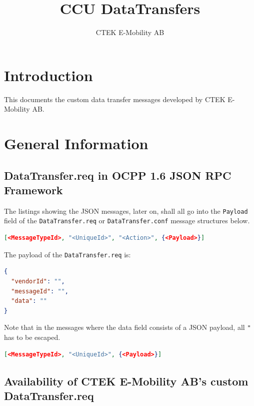 \documentclass{scrartcl}
\title{CCU DataTransfers}
\subtitle{}
\author{CTEK E-Mobility AB}
\begin{document}
\maketitle
\section*{Introduction}
This documents the custom data transfer messages developed by CTEK E-Mobility
AB.

\tableofcontents

\newpage
\section{General Information}
\label{sec:general-information}


\subsection{DataTransfer.req in OCPP 1.6 JSON RPC Framework}
\label{sec:datatr-ocpp-1.6}

The listings showing the JSON messages, later on, shall all go into the
\lstinline{Payload} field of the \lstinline{DataTransfer.req} or
\lstinline{DataTransfer.conf} message structures below.

\begin{lstlisting}[language=json,caption={OCPP 1.6 JSON RPC Call message structure},captionpos=t]
[<MessageTypeId>, "<UniqueId>", "<Action>", {<Payload>}]
\end{lstlisting}

The payload of the \lstinline{DataTransfer.req} is:
\begin{lstlisting}[language=json,caption={OCPP 1.6 Payload of DataTransfer.req},captionpos=t]
{
  "vendorId": "",
  "messageId": "",
  "data": ""
}
\end{lstlisting}
Note that in the messages where the data field consists of a JSON payload, all
\lstinline{"} has to be escaped.

\begin{lstlisting}[language=json,caption={OCPP 1.6 JSON RPC CallResult message structure},captionpos=t]
[<MessageTypeId>, "<UniqueId>", {<Payload>}]
\end{lstlisting}


\subsection{Availability of CTEK E-Mobility AB's custom DataTransfer.req}
\label{sec:availability-ctek-e}
\end{document}
